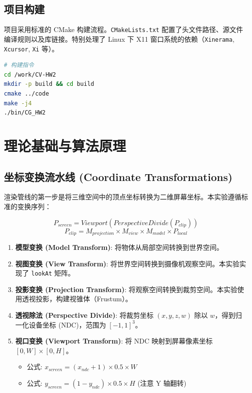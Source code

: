 \documentclass[a4paper]{article}
\begin{document}
\subsection{项目构建}
项目采用标准的 CMake 构建流程。\texttt{CMakeLists.txt} 配置了头文件路径、源文件编译规则以及库链接。特别处理了 Linux 下 X11 窗口系统的依赖（\texttt{Xinerama}, \texttt{Xcursor}, \texttt{Xi} 等）。

\begin{lstlisting}[language=bash, caption={构建指令}]
# 构建指令
cd /work/CV-HW2
mkdir -p build && cd build
cmake ../code
make -j4
./bin/CG_HW2
\end{lstlisting}

\section{理论基础与算法原理}

\subsection{坐标变换流水线 (Coordinate Transformations)}
渲染管线的第一步是将三维空间中的顶点坐标转换为二维屏幕坐标。本实验遵循标准的变换序列：

\[ P_{screen} = Viewport( PerspectiveDivide( P_{clip} ) ) \]
\[ P_{clip} = M_{projection} \times M_{view} \times M_{model} \times P_{local} \]

\begin{enumerate}
    \item \textbf{模型变换 (Model Transform)}: 将物体从局部空间转换到世界空间。
    \item \textbf{视图变换 (View Transform)}: 将世界空间转换到摄像机观察空间。本实验实现了 \texttt{lookAt} 矩阵。
    \item \textbf{投影变换 (Projection Transform)}: 将观察空间转换到裁剪空间。本实验使用透视投影，构建视锥体（Frustum）。
    \item \textbf{透视除法 (Perspective Divide)}: 将裁剪坐标 $(x, y, z, w)$ 除以 $w$，得到归一化设备坐标 (NDC)，范围为 $[-1, 1]^3$。
    \item \textbf{视口变换 (Viewport Transform)}: 将 NDC 映射到屏幕像素坐标 $[0, W] \times [0, H]$。
        \begin{itemize}
            \item 公式: $x_{screen} = (x_{ndc} + 1) \times 0.5 \times W$
            \item 公式: $y_{screen} = (1 - y_{ndc}) \times 0.5 \times H$ (注意 Y 轴翻转)
        \end{itemize}
\end{enumerate}
\end{document}
